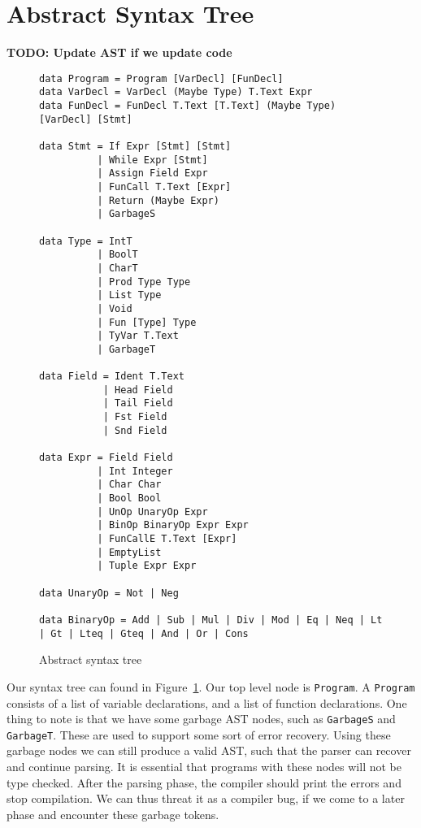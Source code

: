 \documentclass{report}
\begin{document}
\section{Abstract Syntax Tree}
\textbf{TODO: Update AST if we update code}
\begin{figure}
\begin{verbatim}
data Program = Program [VarDecl] [FunDecl]
data VarDecl = VarDecl (Maybe Type) T.Text Expr
data FunDecl = FunDecl T.Text [T.Text] (Maybe Type) [VarDecl] [Stmt]

data Stmt = If Expr [Stmt] [Stmt]
          | While Expr [Stmt]
          | Assign Field Expr
          | FunCall T.Text [Expr]
          | Return (Maybe Expr)
          | GarbageS

data Type = IntT
          | BoolT
          | CharT
          | Prod Type Type
          | List Type
          | Void
          | Fun [Type] Type
          | TyVar T.Text
          | GarbageT

data Field = Ident T.Text
           | Head Field
           | Tail Field
           | Fst Field
           | Snd Field

data Expr = Field Field
          | Int Integer
          | Char Char
          | Bool Bool
          | UnOp UnaryOp Expr
          | BinOp BinaryOp Expr Expr
          | FunCallE T.Text [Expr]
          | EmptyList
          | Tuple Expr Expr

data UnaryOp = Not | Neg

data BinaryOp = Add | Sub | Mul | Div | Mod | Eq | Neq | Lt | Gt | Lteq | Gteq | And | Or | Cons
\end{verbatim}
	\caption{Abstract syntax tree}\label{fig:ast}
\end{figure}
Our syntax tree can found in Figure~\ref{fig:ast}.
Our top level node is \texttt{Program}.
A \texttt{Program} consists of a list of variable declarations,
and a list of function declarations.
One thing to note is that we have some garbage AST nodes, such as \texttt{GarbageS} and \texttt{GarbageT}.
These are used to support some sort of error recovery.
Using these garbage nodes we can still produce a valid AST,
such that the parser can recover and continue parsing.
It is essential that programs with these nodes will not be type checked.
After the parsing phase, the compiler should print the errors and stop compilation.
We can thus threat it as a compiler bug, if we come to a later phase and encounter these garbage tokens.
\end{document}
